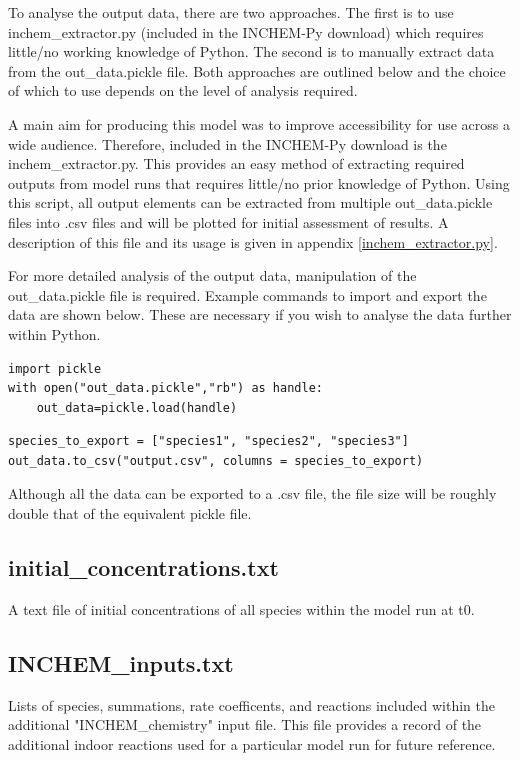 \documentclass[a4paper]{refart}
\begin{document}
To analyse the output data, there are two approaches. The first is to use inchem\_extractor.py (included in the INCHEM-Py download) which requires little/no working knowledge of Python. The second is to manually extract data from the out\_data.pickle file. Both approaches are outlined below and the choice of which to use depends on the level of analysis required.


A main aim for producing this model was to improve accessibility for use across a wide audience. Therefore, included in the INCHEM-Py download is the inchem\_extractor.py. This provides an easy method of extracting required outputs from model runs that requires little/no prior knowledge of Python. Using this script, all output elements can be extracted from multiple out\_data.pickle files into .csv files and will be plotted for initial assessment of results. A description of this file and its usage is given in appendix \ref{inchem_extractor.py}. 


For more detailed analysis of the output data, manipulation of the out\_data.pickle file is required. Example commands to import and export the data are shown below. These are necessary if you wish to analyse the data further within Python.

\begin{verbatim}
import pickle
with open("out_data.pickle","rb") as handle:
    out_data=pickle.load(handle)
\end{verbatim}

\begin{verbatim}
species_to_export = ["species1", "species2", "species3"]
out_data.to_csv("output.csv", columns = species_to_export)
\end{verbatim}
Although all the data can be exported to a .csv file, the file size will be roughly double that of the equivalent pickle file. 

\subsection{initial\_concentrations.txt}
A text file of initial concentrations of all species within the model run at t0.

\subsection{INCHEM\_inputs.txt}
Lists of species, summations, rate coefficents, and reactions included within the additional "INCHEM\_chemistry" input file. This file provides a record of the additional indoor reactions used for a particular model run for future reference.
\end{document}
